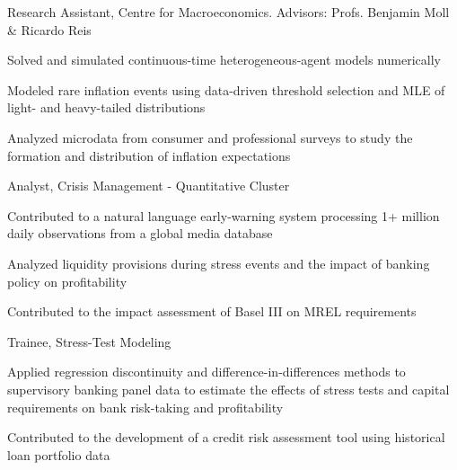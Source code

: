 \documentclass{practical-resume}
\begin{document}
	\begin{position}{Research Assistant, }{Centre for Macroeconomics. Advisors: Profs. Benjamin Moll \& Ricardo Reis}	
		\item Solved and simulated continuous-time heterogeneous-agent models numerically
		\item Modeled rare inflation events using data-driven threshold selection and MLE of light- and heavy-tailed distributions
		\item Analyzed microdata from consumer and professional surveys to study the formation and distribution of inflation expectations
	\end{position}


	\begin{position}{Analyst, }{Crisis Management - Quantitative Cluster}
			\item Contributed to a natural language early-warning system processing 1+ million daily observations from a global media database
			\item Analyzed liquidity provisions during stress events and the impact of banking policy on profitability
			\item Contributed to the impact assessment of Basel III on MREL requirements
	\end{position}
	\begin{position}{Trainee, }{Stress-Test Modeling}
		\item Applied regression discontinuity and difference-in-differences methods to supervisory banking panel data to estimate the effects of stress tests and capital requirements on bank risk-taking and profitability
		\item Contributed to the development of a credit risk assessment tool using historical loan portfolio data
	\end{position}
	
\end{document}
